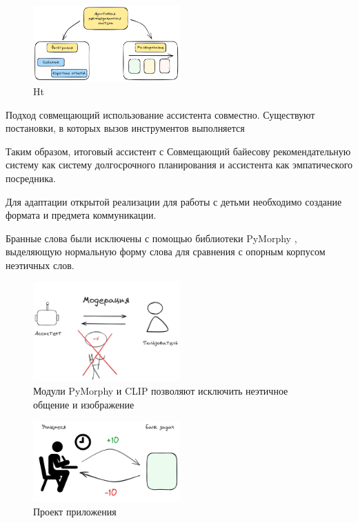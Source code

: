 \begin{figure}[h]
    \centering
    \includegraphics[width=0.5\textwidth]{assets/work/rating/bayes.excalidraw.png}
    \caption{Ht}
    \label{recommendation}
\end{figure}

Подход совмещающий использование ассистента совместно.
Существуют постановки, в которых вызов инструментов выполняется 

Таким образом, итоговый ассистент с
Совмещающий байесову рекомендательную систему как систему долгосрочного планирования и ассистента как эмпатического посредника.



Для адаптации открытой реализации для работы с детьми необходимо создание формата и предмета коммуникации.

Бранные слова были исключены с помощью библиотеки PyMorphy \cite{Korobov2015morph}, выделяющую нормальную форму слова для сравнения
с опорным корпусом неэтичных слов.

\begin{figure}[h]
    \centering
    \includegraphics[width=0.5\textwidth]{assets/work/arch/detox.excalidraw.png}
    \caption{Модули PyMorphy \cite{Korobov2015morph} и CLIP позволяют исключить неэтичное общение и изображение }
    \label{detox}
\end{figure}




\begin{figure}[h]
    \centering
    \includegraphics[width=0.5\textwidth]{assets/work/rating/recommendation.excalidraw.png}
    \caption{Проект приложения}
    \label{arch}
\end{figure}

